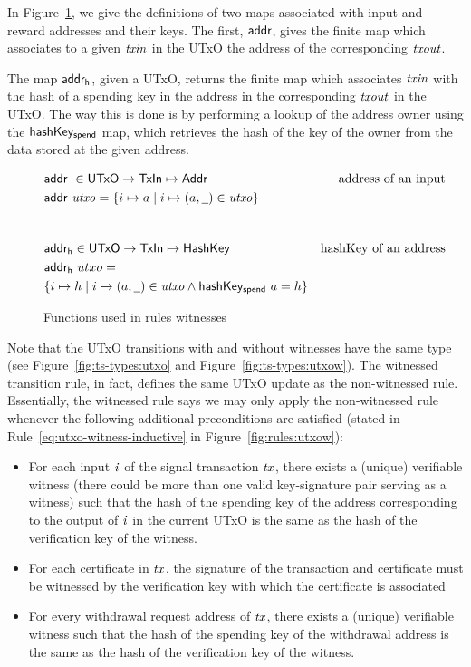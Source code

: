 \documentclass[11pt,a4paper,dvipsnames]{article}
\newcommand{\Addr}{\type{Addr}}
\newcommand{\UTxO}{\type{UTxO}}
\newcommand{\TxIn}{\type{TxIn}}
\newcommand{\HashKey}{\type{HashKey}}
\newcommand{\addr}[1]{\fun{addr}~ \var{#1}}
\newcommand{\wcard}[0]{\underline{\phantom{a}}}
\theoremstyle{definition}
\theoremstyle{definition}
\begin{document}
In Figure~\ref{fig:derived-defs:utxow}, we give the definitions of two maps
associated with input and reward addresses and their keys.
The first, $\mathsf{addr}$, gives the finite map
which associates to a given $\mathit{txin}$ in the UTxO the address of the
corresponding $\mathit{txout}$.

The map $\mathsf{addr_h}$, given a UTxO, returns the
finite map which associates $\mathit{txin}$ with the hash of a spending key in
the address in the corresponding $\mathit{txout}$ in the UTxO. The way this is
done is by performing a lookup of the address owner using the
$\mathsf{hashKey_{spend}}$ map,
which retrieves the hash of the key of
the owner from the data stored at the given address.

\begin{figure}
  \begin{align*}
    & \addr{}{} \in \UTxO \to \TxIn \mapsto \Addr & \text{address of an input}\\
    & \addr{utxo} = \{ i \mapsto a \mid i \mapsto (a, \wcard) \in \var{utxo} \} \\
    \nextdef
    & \fun{addr_h} \in \UTxO \to \TxIn \mapsto \HashKey &
        \text{hashKey of an address}\\
    & \fun{addr_h}~utxo = \\
      &
      \{ i \mapsto h \mid i \mapsto (a, \wcard) \in \var{utxo}
        \wedge \fun{hashKey_{spend}}~{a} = h \} \\
  \end{align*}
  \caption{Functions used in rules witnesses}
  \label{fig:derived-defs:utxow}
\end{figure}


Note that the UTxO transitions with and without witnesses have the same type
(see Figure~\ref{fig:ts-types:utxo} and Figure~\ref{fig:ts-types:utxow}).
The witnessed transition rule, in fact, defines the same UTxO update as the
non-witnessed rule. Essentially, the witnessed rule says we may only apply the non-witnessed rule whenever the following
additional preconditions are satisfied
(stated in Rule~\ref{eq:utxo-witness-inductive} in
Figure~\ref{fig:rules:utxow}):

\begin{itemize}
 \item For each input $\mathit{i}$ of the signal transaction $\mathit{tx}$,
 there exists a (unique) verifiable witness (there could be more than one valid
 key-signature pair serving as a witness) such that the hash of the spending key
 of the address corresponding to the output of $\mathit{i}$ in the current UTxO
 is the same as the hash of the verification key of the witness.

 \item For each certificate in $\mathit{tx}$, the signature of the transaction
 and certificate must be witnessed by the
   verification key with which the certificate is associated

 \item For every withdrawal request address of $\mathit{tx}$,
 there exists a (unique) verifiable witness such that the hash of the spending key of the
 withdrawal address is the same as the hash of the verification key of the witness.
\end{itemize}
\end{document}
